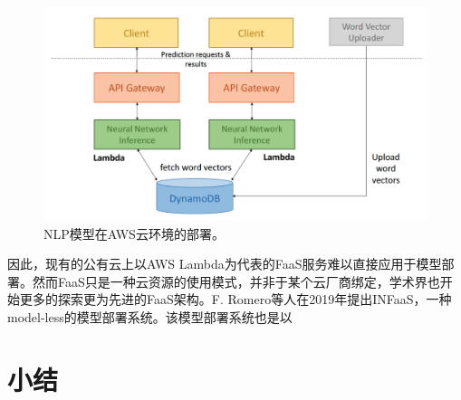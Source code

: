 \begin{figure}[h]
    \centerline{\includegraphics[width=\textwidth]{figures/nlp-serving-arch.png}}
    \caption{NLP模型在AWS云环境的部署。}
    \label{nlp_serving_arch}
\end{figure}

因此，现有的公有云上以AWS Lambda为代表的FaaS服务难以直接应用于模型部署。然而FaaS只是一种云资源的使用模式，并非于某个云厂商绑定，学术界也开始更多的探索更为先进的FaaS架构。F. Romero\parencite{romero2019infaas}等人在2019年提出INFaaS，一种model-less的模型部署系统。该模型部署系统也是以

\section{小结}
